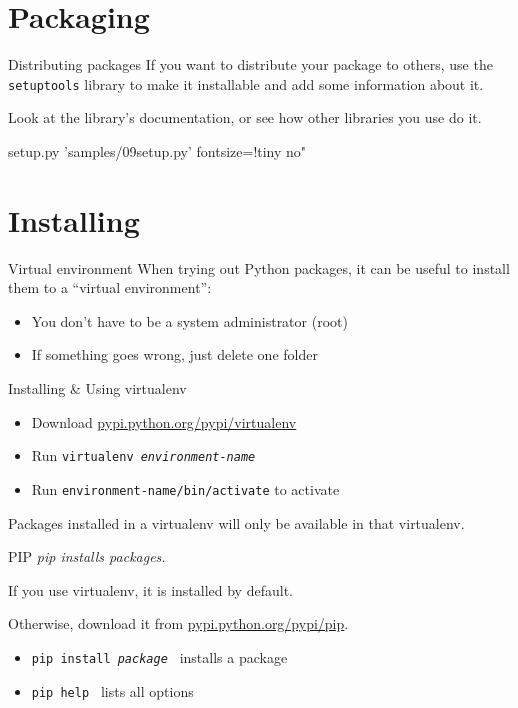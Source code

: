 \documentclass{pyslides}
\begin{document}
\section{Packaging}

\begin{frame}[fragile]{Distributing packages}
If you want to distribute your package to others, use the \texttt{setuptools} library
to make it installable and add some information about it.

\bigskip

Look at the library's documentation, or see how other libraries you use do it.
\end{frame}

\begin{frame}[fragile]{setup.py}
 'samples/09setup.py' fontsize=!tiny no"
\end{frame}

\section{Installing}

\begin{frame}[fragile]{Virtual environment}
When trying out Python packages, it can be useful to install them to a “virtual environment”:
\begin{itemize}
\item You don't have to be a system administrator (root)
\item If something goes wrong, just delete one folder
\end{itemize}
\end{frame}

\begin{frame}[fragile]{Installing \& Using virtualenv}
\begin{itemize}
\item Download \href{http://pypi.python.org/pypi/virtualenv}{pypi.python.org/pypi/virtualenv}
\item Run \texttt{virtualenv \emph{environment-name}}
\item Run \texttt{environment-name/bin/activate} to activate
\end{itemize}
Packages installed in a virtualenv will only be available in that virtualenv.
\end{frame}

\begin{frame}[fragile]{PIP}
\emph{pip installs packages.}

\bigskip

If you use virtualenv, it is installed by default.

Otherwise, download it from \href{http://pypi.python.org/pypi/pip}{pypi.python.org/pypi/pip}.

\bigskip

\begin{itemize}
\item \texttt{pip install \emph{package} } installs a package
\item \texttt{pip help } lists all options
\end{itemize}

\end{frame}
\end{document}
